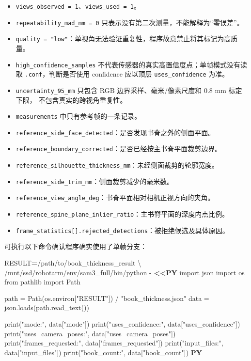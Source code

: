 \documentclass[
  chinese,
  11pt,
  a4paper,
]{article}
\newenvironment{Shaded}{\begin{snugshade}}{\end{snugshade}}
\newcommand{\AttributeTok}[1]{\textcolor[rgb]{0.13,0.29,0.53}{#1}}
\newcommand{\DataTypeTok}[1]{\textcolor[rgb]{0.13,0.29,0.53}{#1}}
\newcommand{\ExtensionTok}[1]{#1}
\newcommand{\NormalTok}[1]{#1}
\newcommand{\OperatorTok}[1]{\textcolor[rgb]{0.81,0.36,0.00}{\textbf{#1}}}
\newcommand{\StringTok}[1]{\textcolor[rgb]{0.31,0.60,0.02}{#1}}
\newcommand{\VariableTok}[1]{\textcolor[rgb]{0.00,0.00,0.00}{#1}}
\providecommand{\tightlist}{%
  \setlength{\itemsep}{0pt}\setlength{\parskip}{0pt}}
\begin{document}
\begin{itemize}
\tightlist
\item
  \texttt{views\_observed\ =\ 1}、\texttt{views\_used\ =\ 1}。
\item
  \texttt{repeatability\_mad\_mm\ =\ 0}
  只表示没有第二次测量，不能解释为``零误差''。
\item
  \texttt{quality\ =\ "low"}：单视角无法验证重复性，程序故意禁止将其标记为高质量。
\item
  \texttt{high\_confidence\_samples}
  不代表传感器的真实高置信度点；单帧模式没有读取
  \texttt{.conf}，判断是否使用 confidence 应以顶层
  \texttt{uses\_confidence} 为准。
\item
  \texttt{uncertainty\_95\_mm} 只包含 RGB 边界采样、毫米/像素尺度和 0.8
  mm 标定下限， 不包含真实的跨视角重复性。
\item
  \texttt{measurements} 中只有参考帧的一条记录。
\item
  \texttt{reference\_side\_face\_detected}：是否发现书脊之外的侧面平面。
\item
  \texttt{reference\_boundary\_corrected}：是否已经按主书脊平面裁剪边界。
\item
  \texttt{reference\_silhouette\_thickness\_mm}：未经侧面裁剪的轮廓宽度。
\item
  \texttt{reference\_side\_trim\_mm}：侧面裁剪减少的毫米数。
\item
  \texttt{reference\_view\_angle\_deg}：书脊平面相对相机正视方向的夹角。
\item
  \texttt{reference\_spine\_plane\_inlier\_ratio}：主书脊平面的深度内点比例。
\item
  \texttt{frame\_statistics{[}{]}.rejected\_detections}：被拒绝候选及具体原因。
\end{itemize}

可执行以下命令确认程序确实使用了单帧分支：

\begin{Shaded}
\begin{Highlighting}[]
\VariableTok{RESULT}\OperatorTok{=}\NormalTok{/path/to/book\_thickness\_result }\DataTypeTok{\textbackslash{}}
\ExtensionTok{/mnt/ssd/robotarm/env/sam3\_full/bin/python} \AttributeTok{{-}} \OperatorTok{\textless{}\textless{}\textquotesingle{}PY\textquotesingle{}}
\StringTok{import json}
\StringTok{import os}
\StringTok{from pathlib import Path}

\StringTok{path = Path(os.environ["RESULT"]) / "book\_thickness.json"}
\StringTok{data = json.loads(path.read\_text())}

\StringTok{print("mode:", data["mode"])}
\StringTok{print("uses\_confidence:", data["uses\_confidence"])}
\StringTok{print("uses\_camera\_poses:", data["uses\_camera\_poses"])}
\StringTok{print("frames\_requested:", data["frames\_requested"])}
\StringTok{print("input\_files:", data["input\_files"])}
\StringTok{print("book\_count:", data["book\_count"])}
\OperatorTok{PY}
\end{Highlighting}
\end{Shaded}
\end{document}
